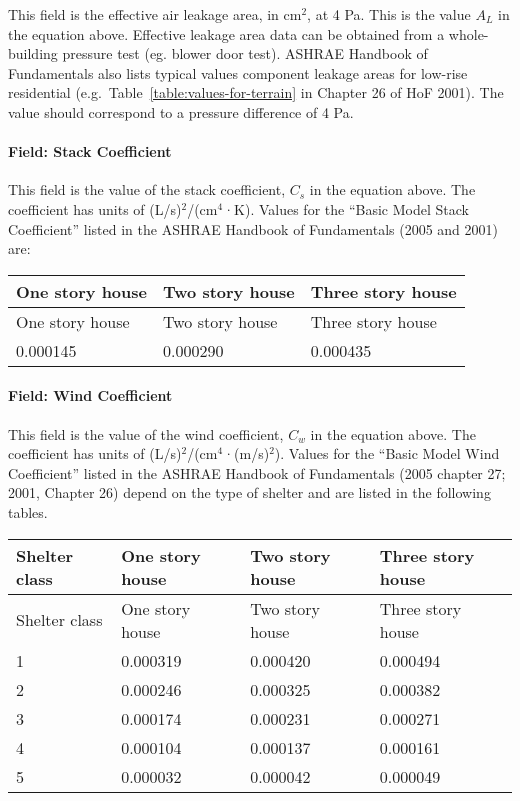 This field is the effective air leakage area, in cm\(^{2}\), at 4 Pa. This is the value \({A_L}\) in the equation above. Effective leakage area data can be obtained from a whole-building pressure test (eg. blower door test). ASHRAE Handbook of Fundamentals also lists typical values component leakage areas for low-rise residential (e.g.~Table~\ref{table:values-for-terrain} in Chapter 26 of HoF 2001). The value should correspond to a pressure difference of 4 Pa.

\paragraph{Field: Stack Coefficient}\label{field-stack-coefficient}

This field is the value of the stack coefficient, \({C_s}\) in the equation above. The coefficient has units of (L/s)\(^{2}\)/(cm\(^{4}\)·K). Values for the ``Basic Model Stack Coefficient'' listed in the ASHRAE Handbook of Fundamentals (2005 and 2001) are:

\begin{longtable}[c]{@{}lll@{}}
\toprule 
One story house & Two story house & Three story house \tabularnewline
\midrule
\endfirsthead

\toprule 
One story house & Two story house & Three story house \tabularnewline
\midrule
\endhead

0.000145 & 0.000290 & 0.000435 \tabularnewline
\bottomrule
\end{longtable}

\paragraph{Field: Wind Coefficient}\label{field-wind-coefficient}

This field is the value of the wind coefficient, \({C_w}\) in the equation above. The coefficient has units of (L/s)\(^{2}\)/(cm\(^{4}\)·(m/s)\(^{2}\)). Values for the ``Basic Model Wind Coefficient'' listed in the ASHRAE Handbook of Fundamentals (2005 chapter 27; 2001, Chapter 26) depend on the type of shelter and are listed in the following tables.

\begin{longtable}[c]{@{}llll@{}}
\toprule
Shelter class & One story house & Two story house & Three story house \tabularnewline
\midrule
\endfirsthead

\toprule 
Shelter class & One story house & Two story house & Three story house \tabularnewline
\midrule
\endhead

1 & 0.000319 & 0.000420 & 0.000494 \tabularnewline
2 & 0.000246 & 0.000325 & 0.000382 \tabularnewline
3 & 0.000174 & 0.000231 & 0.000271 \tabularnewline
4 & 0.000104 & 0.000137 & 0.000161 \tabularnewline
5 & 0.000032 & 0.000042 & 0.000049 \tabularnewline
\bottomrule
\end{longtable}

